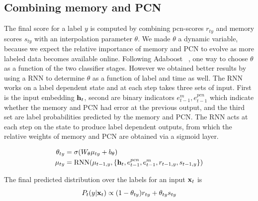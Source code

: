 \documentclass[letterpaper]{article} %
\newcommand{\vek}[1]{{\bf {#1}}}
\newcommand{\vx}{{\vek{x}}}
\newcommand{\vh}{{\vek{h}}}
\newcommand{\lmm}{{s}}
\newcommand{\argmax}{{\text{argmax}}}
\def\shiv#1{\todo [color=orange]{Shiv: #1}}
\begin{document}
\subsection{Combining memory and PCN}
The final score for a label $y$ is computed by combining pcn-scores $r_{ty}$ and memory scores $\lmm_{ty}$ with an interpolation parameter $\theta$.
We made $\theta$ a dynamic variable, because we expect the relative importance of memory and PCN to evolve as more labeled data becomes available online. Following Adaboost ~\cite{Schapire:1999adaboost}, one way to choose $\theta$ as a function of the two classifier stages. However we obtained better results by using a RNN to determine $\theta$ as a function of label and time as well. The RNN works on a label dependent state and at each step takes three sets of input. First is the input embedding $\vh_t$, second are binary indicators $e^m_{t-1}, e^{pcn}_{t-1}$ which indicate whether the memory and PCN had error at the previous output, and the third set are label probabilities predicted by the memory and PCN. The RNN acts at each step on the state to produce label dependent outputs, from which the relative weights of memory and PCN are obtained via a sigmoid layer.

\begin{equation}
\label{eq-comb}
\begin{split}
 \theta_{ty}& = \sigma(W_\theta \mu_{ty} + b_\theta) \\
 \mu_{ty} &=  \text{RNN}(\mu_{t-1,y}, \{\vh_t, e^{pcn}_{t-1},  e^m_{t-1}, r_{t-1,y}, \lmm_{t-1,y}\}) \\
 \end{split}
\end{equation}

The final predicted distribution over the labels for an input $\vx_t$ is
\begin{equation}
\label{eq:overall}
P_t(y|\vx_t) \propto  (1-\theta_{ty})r_{ty} + \theta_{ty} \lmm_{ty}
\end{equation}
\end{document}
